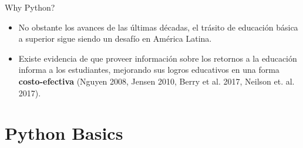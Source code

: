 \documentclass{beamer}
\begin{document}
	\begin{frame}{Why Python?}
		\begin{itemize}
		\item No obstante los avances de las últimas décadas, el trásito de educación básica a superior sigue siendo un desafío en América Latina.
		\item Existe evidencia de que proveer información sobre los retornos a la educación informa a los estudiantes, mejorando sus logros educativos en una forma  \textbf{costo-efectiva} (Nguyen 2008, Jensen 2010, Berry et al. 2017, Neilson et. al. 2017). 
		\end{itemize}
	\end{frame}

  \section{Python Basics}
\end{document}
